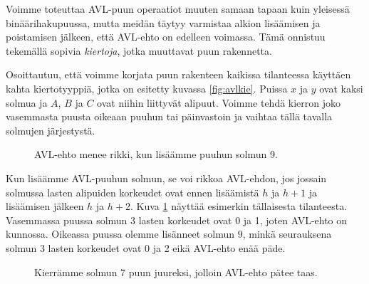 Voimme toteuttaa AVL-puun operaatiot muuten samaan tapaan
kuin yleisessä binäärihakupuussa, mutta meidän täytyy varmistaa
alkion lisäämisen ja poistamisen jälkeen, että AVL-ehto
on edelleen voimassa.
Tämä onnistuu tekemällä sopivia \emph{kiertoja},
jotka muuttavat puun rakennetta.

Osoittautuu, että voimme korjata puun rakenteen kaikissa
tilanteessa käyttäen kahta kiertotyyppiä,
jotka on esitetty kuvassa \ref{fig:avlkie}.
Puissa $x$ ja $y$ ovat kaksi solmua
ja $A$, $B$ ja $C$ ovat niihin liittyvät alipuut.
Voimme tehdä kierron joko vasemmasta puusta oikeaan puuhun
tai päinvastoin ja vaihtaa tällä tavalla solmujen järjestystä.

\begin{figure}
\center
{}
\caption{AVL-ehto menee rikki, kun lisäämme puuhun solmun 9.}
\label{fig:avlrik}
\end{figure}

Kun lisäämme AVL-puuhun solmun, se voi rikkoa AVL-ehdon,
jos jossain solmussa lasten alipuiden korkeudet ovat ennen lisäämistä
$h$ ja $h+1$ ja lisäämisen jälkeen $h$ ja $h+2$.
Kuva \ref{fig:avlrik} näyttää esimerkin tällaisesta tilanteesta.
Vasemmassa puussa solmun $3$ lasten korkeudet ovat 0 ja 1,
joten AVL-ehto on kunnossa.
Oikeassa puussa olemme lisänneet solmun $9$,
minkä seurauksena solmun $3$ lasten korkeudet ovat 0 ja 2
eikä AVL-ehto enää päde.

\begin{figure}
\center
{}
\caption{Kierrämme solmun $7$ puun juureksi, jolloin AVL-ehto pätee taas.}
\label{fig:avlkor}
\end{figure}

